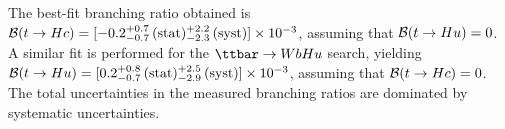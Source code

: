 The best-fit branching ratio obtained is $\mathcal{B}(t\to Hc)=[-0.2^{+0.7}_{-0.7}\,(\mathrm{stat})^{+2.2}_{-2.3}\,(\mathrm{syst})] \times 10^{-3}$,
assuming that $\mathcal{B}(t\to Hu)=0$. 
A similar fit is performed for the $\Hu$ search, yielding $\mathcal{B}(t\to Hu)=[0.2^{+0.8}_{-0.7}\,(\mathrm{stat})^{+2.5}_{-2.9}\,(\mathrm{syst})] \times 10^{-3}$,
assuming that $\mathcal{B}(t\to Hc)=0$.  
The total uncertainties in the measured branching ratios are dominated by systematic uncertainties.

